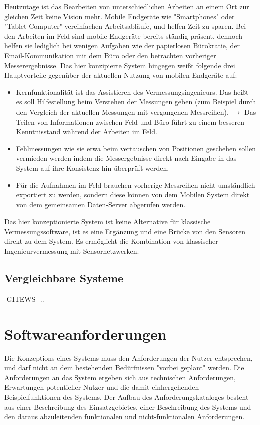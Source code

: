 Heutzutage ist das Bearbeiten von unterschiedlichen Arbeiten an einem Ort zur gleichen Zeit keine Vision mehr. Mobile Endgeräte wie "Smartphones" oder "Tablet-Computer" vereinfachen Arbeitsabläufe, und helfen Zeit zu sparen. Bei den Arbeiten im Feld sind mobile Endgeräte bereits ständig präsent, dennoch helfen sie lediglich bei wenigen Aufgaben wie der papierlosen Bürokratie, der Email-Kommunikation mit dem Büro oder den betrachten vorheriger Messerergebnisse. Das hier konzipierte System hingegen weißt folgende drei Hauptvorteile gegenüber der aktuellen Nutzung von mobilen Endgeräte auf:
\begin{itemize}
\item Kernfunktionalität ist das Assistieren des Vermessungsingenieurs. Das heißt es soll Hilfestellung beim Verstehen der Messungen geben (zum Beispiel durch den Vergleich der aktuellen Messungen mit vergangenen Messreihen). $\rightarrow$ Das Teilen von Informationen zwischen Feld und Büro führt zu einem besseren Kenntnisstand während der Arbeiten im Feld.
\item Fehlmessungen wie sie etwa beim vertauschen von Positionen geschehen sollen vermieden werden indem die Messergebnisse direkt nach Eingabe in das System auf ihre Konsistenz hin überprüft werden.
\item Für die Aufnahmen im Feld brauchen vorherige Messreihen nicht umständlich exportiert zu werden, sondern diese können von dem Mobilen System direkt von dem gemeinsamen Daten-Server abgerufen werden.
\end{itemize}
Das hier konzeptionierte System ist keine Alternative für klassische Vermessungssoftware, ist es eine Ergänzung und eine Brücke von den Sensoren direkt zu dem System. Es ermöglicht die Kombination von klassischer Ingenieurvermessung mit Sensornetzwerken.


\section{Vergleichbare Systeme}
-GITEWS
-..


\chapter{Softwareanforderungen}
Die Konzeptions eines Systems muss den Anforderungen der Nutzer entsprechen, und darf nicht an dem bestehenden Bedürfnissen "vorbei geplant" werden. Die Anforderungen an das System ergeben sich aus technischen Anforderungen, Erwartungen potentieller Nutzer und die damit einhergehenden Beispielfunktionen des Systems. Der Aufbau des Anforderungskataloges besteht aus einer Beschreibung des Einsatzgebietes, einer Beschreibung des Systems und den daraus abzuleitenden funktionalen und nicht-funktionalen Anforderungen.



